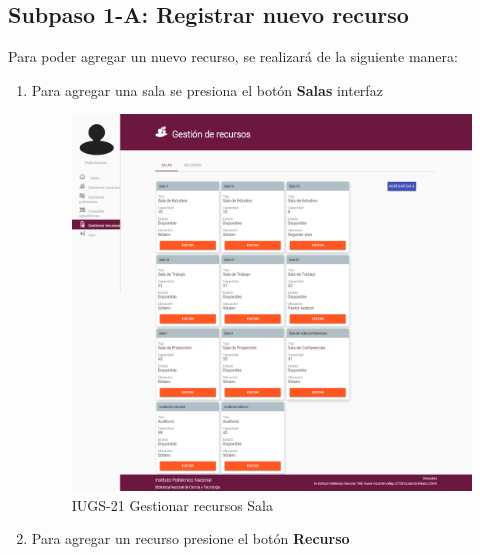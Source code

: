 \subsection{Subpaso 1-A: Registrar nuevo recurso}
	Para poder agregar un nuevo recurso, se realizará de la siguiente manera:
	\begin{enumerate}
		\item Para agregar una sala se presiona 
			el botón \textbf{Salas} interfaz \par
			
			\begin{figure}[hbtp]	
				\begin{center}
				\includegraphics[scale=0.3]{images/Interfaz/IUGS21_GestionarRecursos.png}
				\end{center}
					
			\caption{IUGS-21 Gestionar recursos Sala}
			\end{figure}				
		
		\item Para agregar un recurso presione el botón \textbf{Recurso} \par
		

\end{enumerate}
